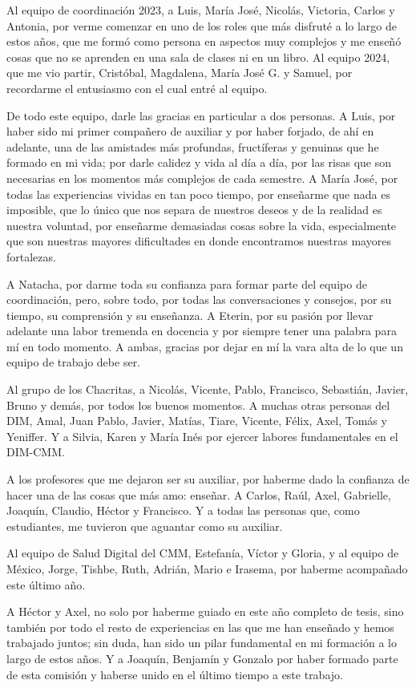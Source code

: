 Al equipo de coordinación 2023, a Luis, María José, Nicolás, Victoria, Carlos y Antonia, por verme comenzar en uno de los roles que más disfruté a lo largo de estos años, que me formó como persona en aspectos muy complejos y me enseñó cosas que no se aprenden en una sala de clases ni en un libro. Al equipo 2024, que me vio partir, Cristóbal, Magdalena, María José G. y Samuel, por recordarme el entusiasmo con el cual entré al equipo.

De todo este equipo, darle las gracias en particular a dos personas. A Luis, por haber sido mi primer compañero de auxiliar y por haber forjado, de ahí en adelante, una de las amistades más profundas, fructíferas y genuinas que he formado en mi vida; por darle calidez y vida al día a día, por las risas que son necesarias en los momentos más complejos de cada semestre. A María José, por todas las experiencias vividas en tan poco tiempo, por enseñarme que nada es imposible, que lo único que nos separa de nuestros deseos y de la realidad es nuestra voluntad, por enseñarme demasiadas cosas sobre la vida, especialmente que son nuestras mayores dificultades en donde encontramos nuestras mayores fortalezas.

A Natacha, por darme toda su confianza para formar parte del equipo de coordinación, pero, sobre todo, por todas las conversaciones y consejos, por su tiempo, su comprensión y su enseñanza. A Eterin, por su pasión por llevar adelante una labor tremenda en docencia y por siempre tener una palabra para mí en todo momento. A ambas, gracias por dejar en mí la vara alta de lo que un equipo de trabajo debe ser.

Al grupo de los Chacritas, a Nicolás, Vicente, Pablo, Francisco, Sebastián, Javier, Bruno y demás, por todos los buenos momentos. A muchas otras personas del DIM, Amal, Juan Pablo, Javier, Matías, Tiare, Vicente, Félix, Axel, Tomás y Yeniffer. Y a Silvia, Karen y María Inés por ejercer labores fundamentales en el DIM-CMM.

A los profesores que me dejaron ser su auxiliar, por haberme dado la confianza de hacer una de las cosas que más amo: enseñar. A Carlos, Raúl, Axel, Gabrielle, Joaquín, Claudio, Héctor y Francisco. Y a todas las personas que, como estudiantes, me tuvieron que aguantar como su auxiliar.

Al equipo de Salud Digital del CMM, Estefanía, Víctor y Gloria, y al equipo de México, Jorge, Tishbe, Ruth, Adrián, Mario e Irasema, por haberme acompañado este último año.

A Héctor y Axel, no solo por haberme guiado en este año completo de tesis, sino también por todo el resto de experiencias en las que me han enseñado y hemos trabajado juntos; sin duda, han sido un pilar fundamental en mi formación a lo largo de estos años. Y a Joaquín, Benjamín y Gonzalo por haber formado parte de esta comisión y haberse unido en el último tiempo a este trabajo.